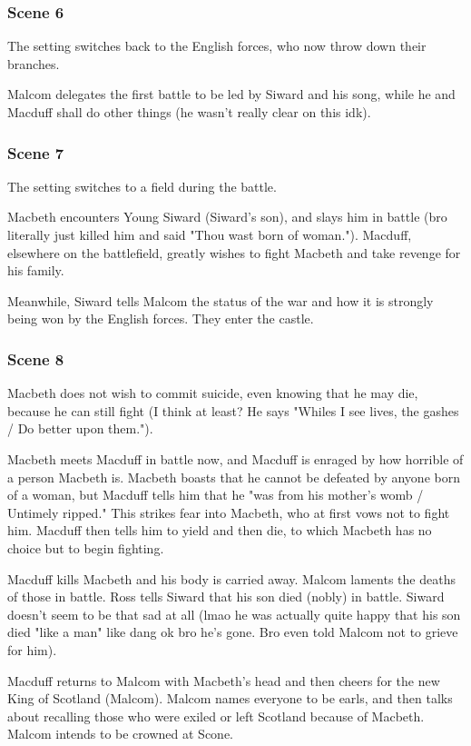 \subsubsection{Scene 6}

The setting switches back to the English forces, who now throw down their
branches.

Malcom delegates the first battle to be led by Siward and his song, while he
and Macduff shall do other things (he wasn't really clear on this idk).

\subsubsection{Scene 7}

The setting switches to a field during the battle.

Macbeth encounters Young Siward (Siward's son), and slays him in battle (bro literally just killed him and said "Thou wast born of woman."). Macduff, elsewhere on the battlefield, greatly wishes to fight Macbeth and take revenge for his family.

Meanwhile, Siward tells Malcom the status of the war and how it is strongly
being won by the English forces. They enter the castle.

\subsubsection{Scene 8}

Macbeth does not wish to commit suicide, even knowing that he may die, because he can still fight (I think at least? He says "Whiles I see lives, the gashes / Do better upon them.").

Macbeth meets Macduff in battle now, and Macduff is enraged by how horrible of
a person Macbeth is. Macbeth boasts that he cannot be defeated by anyone born
of a woman, but Macduff tells him that he "was from his mother's womb /
Untimely ripped." This strikes fear into Macbeth, who at first vows not to
fight him. Macduff then tells him to yield and then die, to which Macbeth has
no choice but to begin fighting.

Macduff kills Macbeth and his body is carried away. Malcom laments the deaths
of those in battle. Ross tells Siward that his son died (nobly) in battle.
Siward doesn't seem to be that sad at all (lmao he was actually quite happy
that his son died "like a man" like dang ok bro he's gone. Bro even told Malcom
not to grieve for him).

Macduff returns to Malcom with Macbeth's head and then cheers for the new King
of Scotland (Malcom). Malcom names everyone to be earls, and then talks about
recalling those who were exiled or left Scotland because of Macbeth. Malcom
intends to be crowned at Scone.
